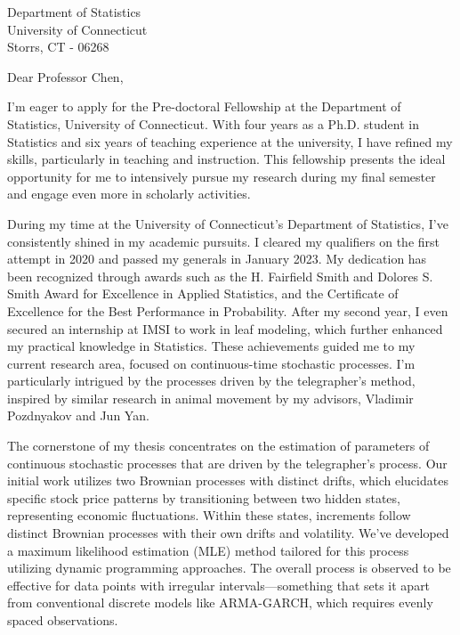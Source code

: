 \documentclass[a4paper,10pt]{letter}
\begin{document}
\begin{letter}{%
Department of Statistics \\
University of Connecticut \\
Storrs, CT - 06268
}

\opening{Dear Professor Chen,}

I'm eager to apply for the Pre-doctoral Fellowship at the Department
of Statistics, University of Connecticut. With four years as a Ph.D.
student in Statistics and six years of teaching experience at the
university, I have refined my skills, particularly in teaching and
instruction. This fellowship presents the ideal opportunity for me to
intensively pursue my research during my final semester and engage
even more in scholarly activities.

During my time at the University of Connecticut's Department of
Statistics, I've consistently shined in my academic pursuits. I
cleared my qualifiers on the first attempt in 2020 and passed my
generals in January 2023. My dedication has been recognized through
awards such as the H. Fairfield Smith and Dolores S. Smith Award for
Excellence in Applied Statistics, and the Certificate of Excellence
for the Best Performance in Probability. After my second year, I even
secured an internship at IMSI to work in leaf modeling, which further
enhanced my practical knowledge in Statistics. These achievements
guided me to my current research area, focused on continuous-time
stochastic processes. I'm particularly intrigued by the processes
driven by the telegrapher's method, inspired by similar research in
animal movement by my advisors, Vladimir Pozdnyakov and Jun Yan.

The cornerstone of my thesis concentrates on the estimation of
parameters of continuous stochastic processes that are driven by the
telegrapher's process. Our initial work utilizes two Brownian
processes with distinct drifts, which elucidates specific stock price
patterns by transitioning between two hidden states, representing
economic fluctuations. Within these states, increments follow distinct
Brownian processes with their own drifts and volatility.  We've
developed a maximum likelihood estimation (MLE) method tailored for
this process utilizing dynamic programming approaches. The overall
process is observed to be effective for data points with irregular
intervals—something that sets it apart from conventional discrete
models like ARMA-GARCH, which requires evenly spaced observations. 


\end{letter}
\end{document}
